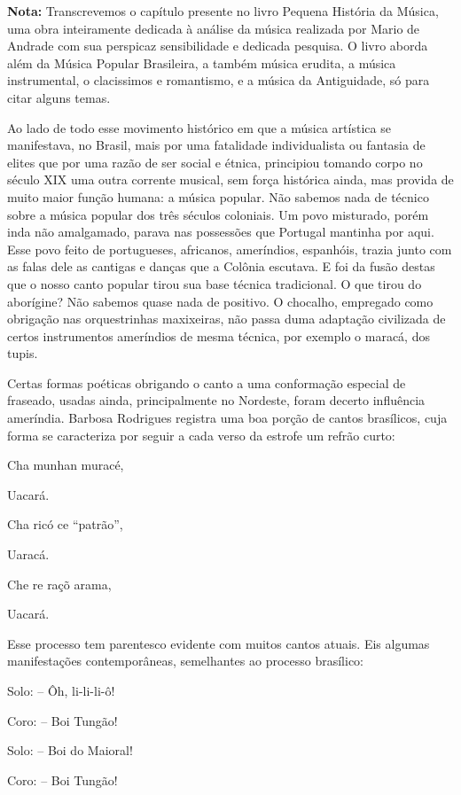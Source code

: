 \textbf{Nota:} Transcrevemos o capítulo presente no livro Pequena
História da Música, uma obra inteiramente dedicada à análise da música
realizada por Mario de Andrade com sua perspicaz sensibilidade e
dedicada pesquisa. O livro aborda além da Música Popular Brasileira, a
também música erudita, a música instrumental, o clacissimos e
romantismo, e a música da Antiguidade, só para citar alguns temas.

Ao lado de todo esse movimento histórico em que a música artística se
manifestava, no Brasil, mais por uma fatalidade individualista ou
fantasia de elites que por uma razão de ser social e étnica, principiou
tomando corpo no século XIX uma outra corrente musical, sem força
histórica ainda, mas provida de muito maior função humana: a música
popular. Não sabemos nada de técnico sobre a música popular dos três
séculos coloniais. Um povo misturado, porém inda não amalgamado, parava
nas possessões que Portugal mantinha por aqui. Esse povo feito de
portugueses, africanos, ameríndios, espanhóis, trazia junto com as falas
dele as cantigas e danças que a Colônia escutava. E foi da fusão destas
que o nosso canto popular tirou sua base técnica tradicional. O que
tirou do aborígine? Não sabemos quase nada de positivo. O chocalho,
empregado como obrigação nas orquestrinhas maxixeiras, não passa duma
adaptação civilizada de certos instrumentos ameríndios de mesma técnica,
por exemplo o maracá, dos tupis.

Certas formas poéticas obrigando o canto a uma conformação especial de
fraseado, usadas ainda, principalmente no Nordeste, foram decerto
influência ameríndia. Barbosa Rodrigues registra uma boa porção de
cantos brasílicos, cuja forma se caracteriza por seguir a cada verso da
estrofe um refrão curto:

Cha munhan muracé,

Uacará.

Cha ricó ce ``patrão'',

Uaracá.

Che re raçõ arama,

Uacará.

Esse processo tem parentesco evidente com muitos cantos atuais. Eis
algumas manifestações contemporâneas, semelhantes ao processo brasílico:

Solo: -- Ôh, li-li-li-ô!

Coro: -- Boi Tungão!

Solo: -- Boi do Maioral!

Coro: -- Boi Tungão!

